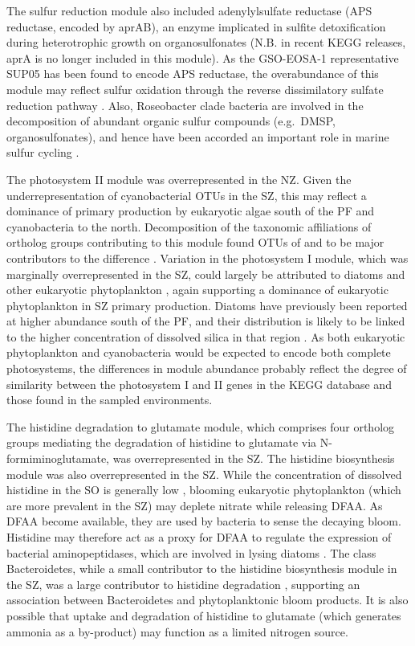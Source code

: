 The sulfur reduction module also included adenylylsulfate reductase (APS reductase, encoded by aprAB), an enzyme implicated in sulfite detoxification during heterotrophic growth on organosulfonates \cite{Meyer:2007jd} (N.B. in recent \ac{KEGG} releases, aprA is no longer included in this module).
As the GSO-EOSA-1 representative SUP05 has been found to encode APS reductase, the overabundance of this module may reflect sulfur oxidation through the reverse dissimilatory sulfate reduction pathway \cite{Walsh:2009fja}.
Also, Roseobacter clade bacteria are involved in the decomposition of abundant organic sulfur compounds (e.g.\ \ac{DMSP}, organosulfonates), and hence have been accorded an important role in marine sulfur cycling \cite{Moran:2007fs}.

The photosystem II module was overrepresented in the \ac{NZ}.
Given the underrepresentation of cyanobacterial \acp{OTU} in the \ac{SZ}, this may reflect a dominance of primary production by eukaryotic algae south of the \ac{PF} and cyanobacteria to the north.
Decomposition of the taxonomic affiliations of ortholog groups contributing to this module found \acp{OTU} of  and  to be major contributors to the difference .
Variation in the photosystem I module, which was marginally overrepresented in the \ac{SZ}, could largely be attributed to diatoms and other eukaryotic phytoplankton , again supporting a dominance of eukaryotic phytoplankton in \ac{SZ} primary production.
Diatoms have previously been reported at higher abundance south of the \ac{PF}, and their distribution is likely to be linked to the higher concentration of dissolved silica in that region \cite{Trull:2001tg}.
As both eukaryotic phytoplankton and cyanobacteria would be expected to encode both complete photosystems, the differences in module abundance probably reflect the degree of similarity between the photosystem I and II genes in the \ac{KEGG} database and those found in the sampled environments. 

The histidine degradation to glutamate module, which comprises four ortholog groups mediating the degradation of histidine to glutamate via N-formiminoglutamate, was overrepresented in the \ac{SZ}.
The histidine biosynthesis module was also overrepresented in the \ac{SZ}.
While the concentration of dissolved histidine in the \ac{SO} is generally low \cite{Kawahata:2000ur}, blooming eukaryotic phytoplankton (which are more prevalent in the \ac{SZ}) may deplete nitrate while releasing \ac{DFAA}.
As \ac{DFAA} become available, they are used by bacteria to sense the decaying bloom. 
Histidine may therefore act as a proxy for \ac{DFAA} to regulate the expression of bacterial aminopeptidases, which are involved in lysing diatoms \cite{Bidle:2001vi}.
The class Bacteroidetes, while a small contributor to the histidine biosynthesis module in the \ac{SZ}, was a large contributor to histidine degradation , supporting an association between Bacteroidetes and phytoplanktonic bloom products. 
It is also possible that uptake and degradation of histidine to glutamate (which generates ammonia as a by-product) may function as a limited nitrogen source.

